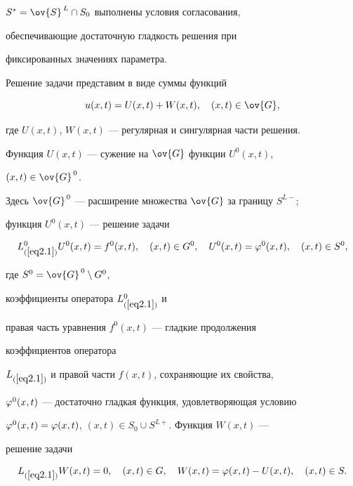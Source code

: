 $S^{*}=\ov{S}^{\,L} \cap S_0$ выполнены условия согласования,


обеспечивающие достаточную гладкость решения при


фиксированных значениях параметра.





Решение задачи представим в виде суммы функций


\begin{equation}


\label{eq3.1}


u(x,t)=U(x,t)+W(x,t),\quad (x,t)\in\ov{G},


\end{equation}


где $U(x,t)$, $W(x,t)$ --- регулярная и сингулярная части решения.


Функция $U(x,t)$ --- сужение на $\ov{G}$ функции $U^0(x,t)$,


$(x,t)\in\ov{G}^{\,0}$.


Здесь $\ov{G}^{\,0}$ --- расширение множества $\ov{G}$ за границу $S^{L-}$;


функция $U^0(x,t)$ --- решение задачи


$$


L^0_{(\ref{eq2.1})}U^0(x,t)=f^0(x,t),\quad (x,t)\in G^0,\quad


U^0(x,t)=\f^0(x,t),\quad (x,t)\in S^0,


$$


где $S^0=\ov{G}^{\,0}\setminus G^0$,


коэффициенты оператора $L^0_{(\ref{eq2.1})}$ и


правая часть уравнения $f^0(x,t)$ --- гладкие продолжения


коэффициентов оператора


$L_{(\ref{eq2.1})}$ и правой части $f(x,t)$, сохраняющие их свойства,


$\varphi^0(x,t)$ --- достаточно гладкая функция, удовлетворяющая условию


$\varphi^0(x,t)=\varphi(x,t)$, $(x,t)\in S_0\cup S^{L+}$. Функция $W(x,t)$ ---


решение задачи


$$


L_{(\ref{eq2.1})}W(x,t)=0,\quad (x,t)\in G,\quad


W(x,t)=\f(x,t)-U(x,t),\quad (x,t)\in S.


$$





